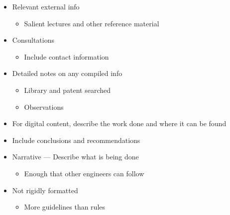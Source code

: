 \begin{itemize}
\begin{itemize}
\begin{itemize}
          \item Relevant external info

            \begin{itemize}

              \item Salient lectures and other reference material

            \end{itemize}

          \item Consultations

            \begin{itemize}

              \item Include contact information

            \end{itemize}

          \item Detailed notes on any compiled info

            \begin{itemize}

              \item Library and patent searched

              \item Observations

            \end{itemize}

          \item For digital content, describe the work done and where it can be found

          \item Include conclusions and recommendations 

          \item Narrative — Describe what is being done

            \begin{itemize}

              \item Enough that other engineers can follow

            \end{itemize}

          \item Not rigidly formatted

            \begin{itemize}

              \item More guidelines than rules


\end{itemize}
\end{itemize}
\end{itemize}
\end{itemize}
